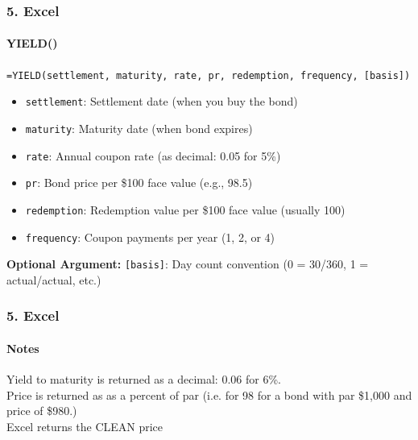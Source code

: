 \documentclass{beamer}
\begin{document}
\begin{excelframe}[t]
    \frametitle{5. Excel}
    \framesubtitle{YIELD()}

    \texttt{=YIELD(settlement, maturity, rate, pr, redemption, frequency, [basis])}
    \vspace{1em}

    \begin{itemize}
        \item \texttt{settlement}: Settlement date (when you buy the bond)
        \item \texttt{maturity}: Maturity date (when bond expires)
        \item \texttt{rate}: Annual coupon rate (as decimal: 0.05 for 5\%)
        \item \texttt{pr}: Bond price per \$100 face value (e.g., 98.5)
        \item \texttt{redemption}: Redemption value per \$100 face value (usually 100)
        \item \texttt{frequency}: Coupon payments per year (1, 2, or 4)
    \end{itemize}
    \vspace{1em}

    \textbf{Optional Argument:} \texttt{[basis]}: Day count convention (0 = 30/360, 1 = actual/actual, etc.)
   
\end{excelframe}

\begin{excelframe}[t]
    \frametitle{5. Excel}
    \framesubtitle{Notes}

    Yield to maturity is returned as a decimal: 0.06 for 6\%.\\
    \vspace{1em}
    Price is returned as as a percent of par (i.e. for 98 for a bond with par \$1,000 and price of \$980.)\\
    \vspace{1em}
    Excel returns the CLEAN price\\

\end{excelframe}
\end{document}
